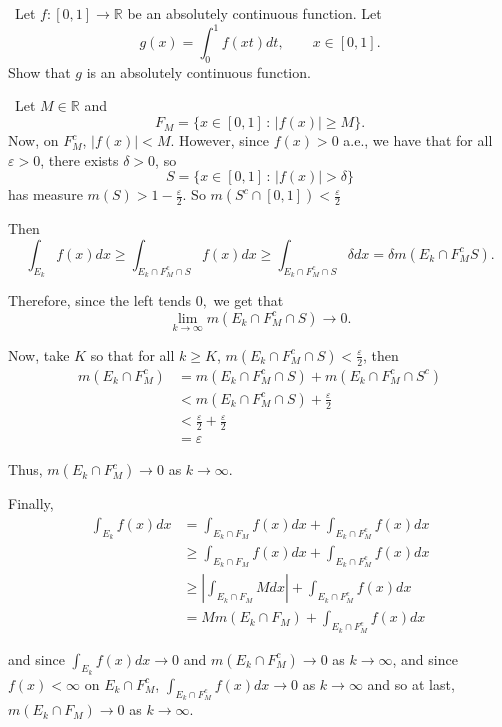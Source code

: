 \documentclass[12pt]{Qual}
\begin{document}
\begin{problem} $\,$
Let $f:[0,1]\to\mathbb{R}$ be an absolutely continuous function. Let $$g(x)=\int_0^1f(xt)dt,\qquad x\in[0,1].$$ Show that $g$ is an absolutely continuous function.
\end{problem}


\begin{solution}$\,$
Let $M\in\mathbb{R}$ and $$F_M=\{x\in[0,1]\,:\,|f(x)|\ge M\}.$$ Now, on $F_M^c$, $|f(x)|<M$. However, since $f(x)>0$ a.e., we have that for all $\varepsilon>0$, there exists $\delta>0$, so $$S=\{x\in [0,1]\,:\,|f(x)|>\delta\}$$ has measure $m(S)>1-\frac{\varepsilon}{2}$. So $m(S^c\cap[0,1])<\frac{\varepsilon}{2}$

Then $$\int_{E_k}f(x)dx\ge\int_{E_k\cap F_M^c\cap S}f(x)dx\ge\int_{E_k\cap F_M^c\cap S}\delta dx=\delta m(E_k\cap F_M^c S).$$

Therefore, since the left tends $0,$ we get that $$\lim_{k\to\infty}m(E_k\cap F_M^c\cap S)\to0.$$

Now, take $K$ so that for all $k\ge K$, $m(E_k\cap F_M^c\cap S)<\frac{\varepsilon}{2}$, then \begin{align*}
    m(E_k\cap F_M^c)&=m(E_k\cap F_M^c\cap S)+m(E_k\cap F_M^c\cap S^c)\\
    &<m(E_k\cap F_M^c\cap S)+\frac{\varepsilon}{2}\\
    &<\frac{\varepsilon}{2}+\frac{\varepsilon}{2}\\
    &=\varepsilon
\end{align*}

Thus, $m(E_k\cap F_M^c)\to0$ as $k\to\infty.$

Finally,
\begin{align*}
    \int_{E_k}f(x)dx&=\int_{E_k\cap F_M}f(x)dx+\int_{E_k\cap F_M^c}f(x)dx\\
    &\ge\int_{E_k\cap F_M}f(x)dx+\int_{E_k\cap F_M^c}f(x)dx\\
    &\ge\left|\int_{E_k\cap F_M}Mdx\right|+\int_{E_k\cap F_M^c}f(x)dx\\
    &=Mm(E_k\cap F_M)+\int_{E_k\cap F_M^c}f(x)dx
\end{align*}

and since $\displaystyle \int_{E_k}f(x)dx\to0$ and $m(E_k\cap F_M^c)\to0$ as $k\to\infty$, and since $f(x)<\infty$ on $E_k\cap F_M^c$, $\displaystyle \int_{E_k\cap F_M^c}f(x)dx\to0$ as $k\to\infty$ and so at last, $m(E_k\cap F_M)\to0$ as $k\to\infty.$
\end{solution}
\newpage
\end{document}
